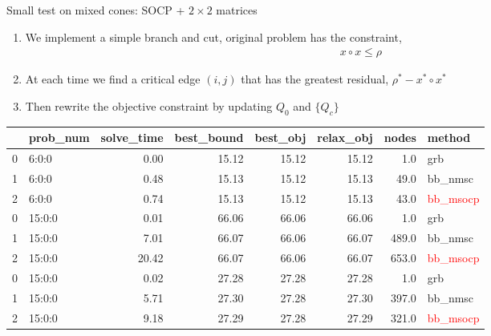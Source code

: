 \documentclass[aspectratio=1610, 10pt]{beamer}
\newcommand{\red}[1]{\textcolor{red}{#1}}
\begin{document}
\begin{frame}[allowframebreaks]{Small test on mixed cones: SOCP + \(2\times 2\) matrices}
  \begin{enumerate}
    \item We implement a simple branch and cut, original problem has the constraint,
          \begin{align*}
            x\circ x \le \rho
          \end{align*}
    \item At each time we find a critical edge \((i, j)\) that has the greatest residual, \(\rho^* - x^* \circ x^*\)
    \item Then rewrite the objective constraint by updating \(Q_0\) and \(\{Q_c\}\)
  \end{enumerate}
  \small
  \begin{longtable}{llrrrrrl}
    \toprule
    {} & prob\_num & solve\_time & best\_bound & best\_obj & relax\_obj & nodes & method          \\
    \midrule
    0  & 6:0:0     & 0.00        & 15.12       & 15.12     & 15.12      & 1.0   & grb             \\
    1  & 6:0:0     & 0.48        & 15.13       & 15.12     & 15.13      & 49.0  & bb\_nmsc        \\
    2  & 6:0:0     & 0.74        & 15.13       & 15.12     & 15.13      & 43.0  & \red{bb\_msocp} \\
    0  & 15:0:0    & 0.01        & 66.06       & 66.06     & 66.06      & 1.0   & grb             \\
    1  & 15:0:0    & 7.01        & 66.07       & 66.06     & 66.07      & 489.0 & bb\_nmsc        \\
    2  & 15:0:0    & 20.42       & 66.07       & 66.06     & 66.07      & 653.0 & \red{bb\_msocp} \\
    0  & 15:0:0    & 0.02        & 27.28       & 27.28     & 27.28      & 1.0   & grb             \\
    1  & 15:0:0    & 5.71        & 27.30       & 27.28     & 27.30      & 397.0 & bb\_nmsc        \\
    2  & 15:0:0    & 9.18        & 27.29       & 27.28     & 27.29      & 321.0 & \red{bb\_msocp} \\
    \bottomrule
  \end{longtable}
  \normalsize
\end{frame}
\end{document}
